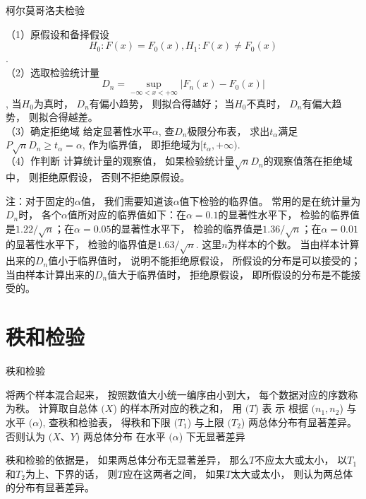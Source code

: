 \begin{algorithm}[]
    \caption{柯尔莫哥洛夫检验}
     （1）原假设和备择假设
\begin{equation}  H_0:F(x)=F_0(x), H_1:F(x)\neq F_0(x)\end{equation}.\\
（2）选取检验统计量
\begin{equation}D_n=\operatorname{sup}_{-\infty<x<+\infty} \left|F_n(x)-F_0(x)\right|\end{equation}, 
当$H_0$为真时， $D_n$有偏小趋势， 则拟合得越好；
当$H_0$不真时， $D_n$有偏大趋势， 则拟合得越差。 \\
（3）确定拒绝域
给定显著性水平$\alpha$, 查$D_n$极限分布表， 求出$t_\alpha$满足
$P{\sqrt n D_n\geq t_\alpha}=\alpha$, 
作为临界值， 即拒绝域为$[t_\alpha,+\infty)$. \\
（4）作判断
计算统计量的观察值， 如果检验统计量$\sqrt n D_n$的观察值落在拒绝域中， 则拒绝原假设， 否则不拒绝原假设。    
\end{algorithm}

注：对于固定的$\alpha$值， 我们需要知道该$\alpha$值下检验的临界值。 常用的是在统计量为$D_n$时， 各个$\alpha$值所对应的临界值如下：在$\alpha=0.1$的显著性水平下， 检验的临界值是$1.22/\sqrt n$；在$\alpha=0.05$的显著性水平下， 检验的临界值是$1.36/\sqrt n$；在$\alpha=0.01$的显著性水平下， 检验的临界值是$1.63/\sqrt n$. 这里$n$为样本的个数。 当由样本计算出来的$D_n$值小于临界值时， 说明不能拒绝原假设， 所假设的分布是可以接受的；当由样本计算出来的$D_n$值大于临界值时， 拒绝原假设， 即所假设的分布是不能接受的。 

\section{秩和检验}

\begin{algorithm}\caption{秩和检验}
将两个样本混合起来， 按照数值大小统一编序由小到大， 每个数据对应的序数称为秩。 \;
计算取自总体 $( X $) 的样本所对应的秩之和， 用 $( {T} $) 表 示\;
根据 $( {n}_{1}, {n}_{2} $) 与水平 $( \alpha $), 查秩和检验表， 得秩和下限 $( {T}_{1} $) 与上限 $( {T}_{{2}} $) \;
两总体分布有显著差异。 否则认为 $( X 、 Y $) 两总体分布
在水平 $( \alpha $) 下无显著差异\;
\end{algorithm}

秩和检验的依据是， 如果两总体分布无显著差异， 那么$T$不应太大或太小， 以$T_1$和$T_2$为上、下界的话， 则$T$应在这两者之间， 如果$T$太大或太小， 则认为两总体的分布有显著差异。 

